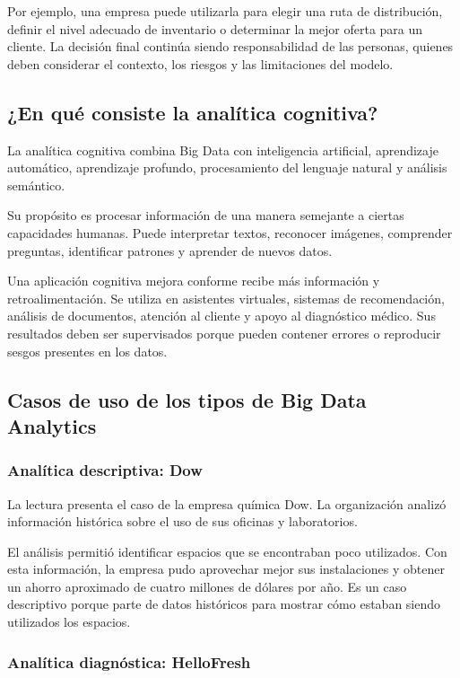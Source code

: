 Por ejemplo, una empresa puede utilizarla para elegir una ruta de distribución,
definir el nivel adecuado de inventario o determinar la mejor oferta para un
cliente. La decisión final continúa siendo responsabilidad de las personas,
quienes deben considerar el contexto, los riesgos y las limitaciones del
modelo.

\subsection{¿En qué consiste la analítica cognitiva?}

La analítica cognitiva combina Big Data con inteligencia artificial,
aprendizaje automático, aprendizaje profundo, procesamiento del lenguaje
natural y análisis semántico.

Su propósito es procesar información de una manera semejante a ciertas
capacidades humanas. Puede interpretar textos, reconocer imágenes, comprender
preguntas, identificar patrones y aprender de nuevos datos.

Una aplicación cognitiva mejora conforme recibe más información y
retroalimentación. Se utiliza en asistentes virtuales, sistemas de
recomendación, análisis de documentos, atención al cliente y apoyo al
diagnóstico médico. Sus resultados deben ser supervisados porque pueden
contener errores o reproducir sesgos presentes en los datos.

\subsection{Casos de uso de los tipos de Big Data Analytics}

\subsubsection*{Analítica descriptiva: Dow}

La lectura presenta el caso de la empresa química Dow. La organización analizó
información histórica sobre el uso de sus oficinas y laboratorios.

El análisis permitió identificar espacios que se encontraban poco utilizados.
Con esta información, la empresa pudo aprovechar mejor sus instalaciones y
obtener un ahorro aproximado de cuatro millones de dólares por año. Es un caso
descriptivo porque parte de datos históricos para mostrar cómo estaban siendo
utilizados los espacios.

\subsubsection*{Analítica diagnóstica: HelloFresh}

